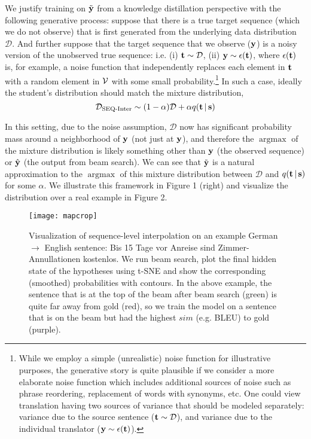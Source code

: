 \documentclass[11pt,letterpaper]{article}
\DeclareMathOperator*{\argmax}{argmax}
\begin{document}
We justify training on $\tilde{\mathbf{y}}$ from a knowledge distillation perspective with the following
generative process: suppose that there is a true target sequence (which we do not observe) that
is first generated from the underlying data distribution  $\mathcal{D}$. And further suppose 
that the target sequence that we observe ($\mathbf{y}$) is a noisy version of the unobserved true sequence: i.e. 
(i) $\mathbf{t} \sim \mathcal{D}$, (ii) $\mathbf{y} \sim \epsilon(\mathbf{t})$, 
where  $\epsilon(\mathbf{t})$ is, for example, a noise function that independently
replaces each element in $\mathbf{t}$ with 
a random element in $\mathcal{V}$ with some small probability.\footnote{While we employ a simple
  (unrealistic) noise function 
for illustrative purposes, the generative story is quite plausible if we consider a more
elaborate noise function which includes additional sources of noise such as phrase reordering,
replacement of words with synonyms, etc. 
One could view translation having two sources of variance that should be modeled separately: 
variance due to the source sentence ($\mathbf{t} \sim \mathcal{D}$), and 
variance due to the individual translator ($\mathbf{y} \sim \epsilon(\mathbf{t})$).}
In such a case, ideally the student's
distribution should match the mixture distribution, 
\begin{equation*}
\mathcal{D}_{\text{SEQ-Inter}} \sim (1-\alpha)\mathcal{D} + \alpha q(\mathbf{t} \,|\, \mathbf{s})
\end{equation*}

In this setting, due to the noise assumption, $\mathcal{D}$ now has significant probability mass around
a neighborhood of $\mathbf{y}$ (not just at $\mathbf{y}$), and therefore the
$\argmax$ of the  mixture distribution is likely something other
than $\mathbf{y}$ (the observed sequence) or $\hat{\mathbf{y}}$ (the output from beam search). 
We can see that 
$\tilde{\mathbf{y}}$ is a natural approximation to the $\argmax$ of this
mixture distribution between $\mathcal{D}$ and $q(\mathbf{t} \,|\, \mathbf{s})$
for some $\alpha$. We illustrate this framework in Figure 1 (right) and visualize the distribution
over a real example in Figure 2.

\begin{figure}[t]\label{fig2}
\centering
\texttt{[image: mapcrop]}
\caption{Visualization of sequence-level interpolation on an example 
German $\rightarrow$ English sentence:
\textsf{Bis 15 Tage vor Anreise sind Zimmer-Annullationen kostenlos}.
We run beam search, plot the final hidden state
of the hypotheses using t-SNE and show the corresponding (smoothed)
probabilities with contours. 
In the above example, the sentence that is at the top of the beam after beam search 
(green) is quite far away from gold (red), so we train the model on a sentence
that is on the beam but had the highest $sim$ (e.g. BLEU) to gold (purple).}
\end{figure}
\end{document}
